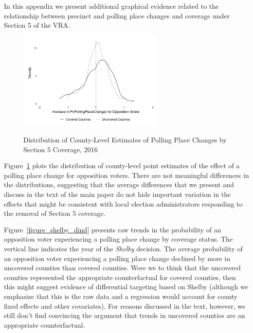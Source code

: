\documentclass[12pt]{article}
\begin{document}
In this appendix we present additional graphical evidence related to the relationship between precinct and polling place changes and coverage under Section 5 of the VRA.


\begin{figure}[h!]
	\begin{center}
    \label{figure_shelby_distribution}
	\caption{Distribution of County-Level Estimates of Polling Place Changes by Section 5 Coverage, 2016}
          \includegraphics[width=0.65\textwidth]{../../50_results_full/county_point_estimate_density_vra.pdf}\\
        \end{center}
    \end{figure} \normalsize


Figure~\ref{figure_shelby_distribution} plots the distribution of county-level point estimates of the effect of a polling place change for opposition voters.  There are not meaningful differences in the distributions, suggesting that the average differences that we present and discuss in the text of the main paper do not hide important variation in the effects that might be consistent with local election administrators responding to the removal of Section 5 coverage.

Figure~\ref{figure_shelby_dind} presents raw trends in the probability of an opposition voter experiencing a polling place change by coverage status.  The vertical line indicates the year of the \emph{Shelby} decision.  The average probability of an opposition voter experiencing a polling place change declined by more in uncovered counties than covered counties.  Were we to think that the uncovered counties represented the appropriate counterfactual for covered counties, then this might suggest evidence of differential targeting based on Shelby (although we emphasize that this is the raw data and a regression would account for county fixed effects and other covariates).  For reasons discussed in the text, however, we still don't find convincing the argument that trends in uncovered counties are an appropriate counterfactual.
\end{document}
